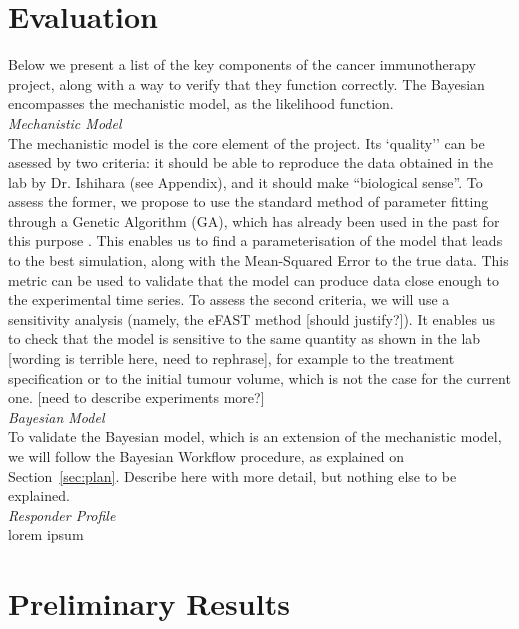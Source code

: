 \documentclass[11pt]{article}
\begin{document}
\section{Evaluation}
Below we present a list of the key components of the cancer immunotherapy project, along with a way to verify that they function correctly. The Bayesian encompasses the mechanistic model, as the likelihood function. \\[11pt]
%
\textit{Mechanistic Model}\\[3pt] %
The mechanistic model is the core element of the project. Its `quality'' can be asessed by two criteria: it should be able to reproduce the data obtained in the lab by Dr. Ishihara (see Appendix), and it should make ``biological sense''. To assess the former, we propose to use the standard method of parameter fitting through a Genetic Algorithm (GA), which has already been used in the past for this purpose \cite{christian2}. This enables us to find a parameterisation of the model that leads to the best simulation, along with the Mean-Squared Error to the true data. This metric can be used to validate that the model can produce data close enough to the experimental time series. To assess the second criteria, we will use a sensitivity analysis (namely, the eFAST method [should justify?]). It enables us to check that the model is sensitive to the same quantity as shown in the lab [wording is terrible here, need to rephrase], for example to the treatment specification or to the initial tumour volume, which is not the case for the current one. [need to describe experiments more?]\\[11pt]
%
\textit{Bayesian Model}\\[3pt]
To validate the Bayesian model, which is an extension of the mechanistic model, we will follow the Bayesian Workflow procedure, as explained on Section~\ref{sec:plan}. Describe here with more detail, but nothing else to be explained.\\[11pt]
%

\textit{Responder Profile}\\[3pt]
lorem ipsum

\section{Preliminary Results}
\end{document}
